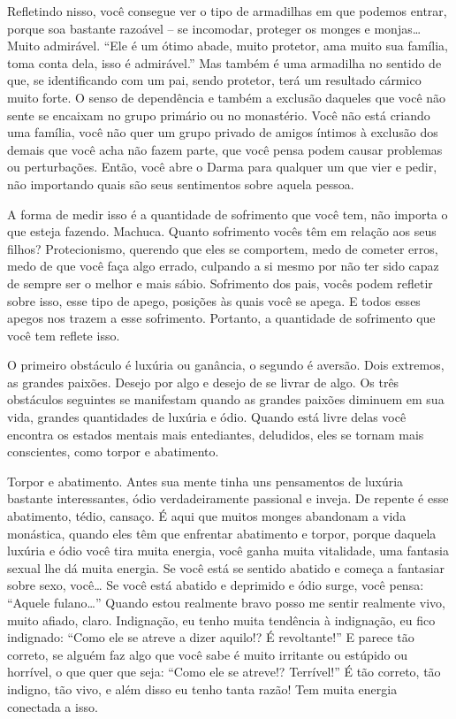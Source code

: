 Refletindo nisso, você consegue ver o tipo de armadilhas em que
podemos entrar, porque soa bastante razoável – se incomodar, proteger
os monges e monjas\ldots{} Muito admirável. “Ele é um ótimo abade, muito
protetor, ama muito sua família, toma conta dela, isso é admirável.”
Mas também é uma armadilha no sentido de que, se identificando com um
pai, sendo protetor, terá um resultado cármico muito forte. O senso de
dependência e também a exclusão daqueles que você não sente se encaixam
no grupo primário ou no monastério. Você não está criando uma família,
você não quer um grupo privado de amigos íntimos à exclusão dos demais
que você acha não fazem parte, que você pensa podem causar problemas ou
perturbações. Então, você abre o Darma para qualquer um que vier e
pedir, não importando quais são seus sentimentos sobre aquela pessoa.

A forma de medir isso é a quantidade de sofrimento que você tem, não
importa o que esteja fazendo. Machuca. Quanto sofrimento vocês têm em
relação aos seus filhos? Protecionismo, querendo que eles se comportem,
medo de cometer erros, medo de que você faça algo errado, culpando a si
mesmo por não ter sido capaz de sempre ser o melhor e mais sábio.
Sofrimento dos pais, vocês podem refletir sobre isso, esse tipo de
apego, posições às quais você se apega. E todos esses apegos nos trazem
a esse sofrimento. Portanto, a quantidade de sofrimento que você tem
reflete isso. 

O primeiro obstáculo é luxúria ou ganância, o segundo é aversão.
Dois extremos, as grandes paixões. Desejo por algo e desejo de se
livrar de algo. Os três obstáculos seguintes se manifestam quando as
grandes paixões diminuem em sua vida, grandes quantidades de luxúria e
ódio. Quando está livre delas você encontra os estados mentais mais
entediantes, deludidos, eles se tornam mais conscientes, como torpor e
abatimento.

Torpor e abatimento. Antes sua mente tinha uns pensamentos de
luxúria bastante interessantes, ódio verdadeiramente passional e
inveja. De repente é esse abatimento, tédio, cansaço. É aqui que muitos
monges abandonam a vida monástica, quando eles têm que enfrentar
abatimento e torpor, porque daquela luxúria e ódio você tira muita
energia, você ganha muita vitalidade, uma fantasia sexual lhe dá muita
energia. Se você está se sentido abatido e começa a fantasiar sobre
sexo, você\ldots{} Se você está abatido e deprimido e ódio surge, você pensa:
“Aquele fulano\ldots{}” Quando estou realmente bravo posso me sentir realmente
vivo, muito afiado, claro. Indignação, eu tenho muita tendência à
indignação, eu fico indignado: “Como ele se atreve a dizer aquilo!? É
revoltante!” E parece tão correto, se alguém faz algo que você sabe é
muito irritante ou estúpido ou horrível, o que quer que seja: “Como ele
se atreve!? Terrível!” É tão correto, tão indigno, tão vivo, e além
disso eu tenho tanta razão! Tem muita energia conectada a isso.

